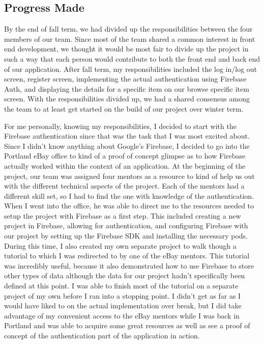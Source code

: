 \documentclass[onecolumn, draftclsnofoot,10pt, compsoc]{IEEEtran}
\begin{document}
\subsection{Progress Made}
\par By the end of fall term, we had divided up the responsibilities between the four members of our team. Since most of the team shared a common interest in front end development, we thought it would be most fair to divide up the project in such a way that each person would contribute to both the front end and back end of our application. After fall term, my responsibilities included the log in/log out screen, register screen, implementing the actual authentication using Firebase Auth, and displaying the details for a specific item on our browse specific item screen. With the responsibilities divided up, we had a shared consensus among the team to at least get started on the build of our project over winter term. 
\par For me personally, knowing my responsibilities, I decided to start with the Firebase authentication since that was the task that I was most excited about. Since I didn’t know anything about Google’s Firebase, I decided to go into the Portland eBay office to kind of a proof of concept glimpse as to how Firebase actually worked within the context of an application. At the beginning of the project, our team was assigned four mentors as a resource to kind of help us out with the different technical aspects of the project. Each of the mentors had a different skill set, so I had to find the one with knowledge of the authentication. When I went into the office, he was able to direct me to the resources needed to setup the project with Firebase as a first step. This included creating a new project in Firebase, allowing for authentication, and configuring Firebase with our project by setting up the Firebase SDK and installing the necessary pods. During this time, I also created my own separate project to walk though a tutorial to which I was redirected to by one of the eBay mentors. This tutorial was incredibly useful, because it also demonstrated how to use Firebase to store other types of data although the data for our project hadn’t specifically been defined at this point. I was able to finish most of the tutorial on a separate project of my own before I ran into a stopping point. I didn’t get as far as I would have liked to on the actual implementation over break, but I did take advantage of my convenient access to the eBay mentors while I was back in Portland and was able to acquire some great resources as well as see a proof of concept of the authentication part of the application in action.
\end{document}
